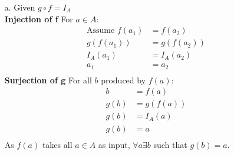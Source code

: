 \documentclass{article}
\begin{document}
\begin{enumerate}
    \item[a.] Given $g \circ f = I_A$\\
        \textbf{Injection of f } For $a \in A$:\[\begin{aligned}
                \text{Assume } f(a_1) & = f(a_2)    \\
                g(f(a_1))             & = g(f(a_2)) \\
                I_A(a_1)              & = I_A(a_2)  \\
                a_1                   & = a_2       \\
            \end{aligned}\]
        \textbf{Surjection of g } For all $b$ produced by $f(a)$: \[\begin{aligned}
                b    & = f(a)    \\
                g(b) & = g(f(a)) \\
                g(b) & = I_A(a)  \\
                g(b) & = a       \\
            \end{aligned}\]
        As $f(a)$ takes all $a \in A$ as input, $\forall a \exists b$ such that $g(b)=a$.\\


\end{enumerate}
\end{document}
